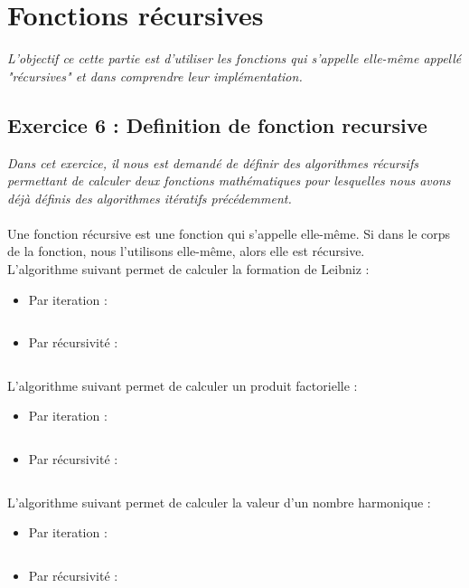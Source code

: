 \section{Fonctions récursives}
\textit{L’objectif ce cette partie est d’utiliser les fonctions qui s’appelle elle-même appellé "récursives" et dans comprendre leur implémentation.}

\subsection{Exercice 6 : Definition de fonction recursive}
\textit{Dans cet exercice, il nous est demandé de définir des algorithmes récursifs permettant de calculer deux fonctions mathématiques pour lesquelles nous avons déjà définis des algorithmes itératifs précédemment.}
\\\\
Une fonction récursive est une fonction qui s'appelle elle-même. Si dans le corps de la fonction, nous l'utilisons elle-même, alors elle est récursive.\\
L'algorithme suivant permet de calculer la formation de Leibniz :

\begin{itemize}
  \item Par iteration :
  \inputminted[linenos,firstline=7,lastline=14]{cpp}{../sources/cpp/TP1-2/piLeibniz.c}
  \item Par récursivité :
  \inputminted[linenos,firstline=16,lastline=19]{cpp}{../sources/cpp/TP1-2/piLeibniz.c}
\end{itemize}

L'algorithme suivant permet de calculer un produit factorielle :
\begin{itemize}
  \item Par iteration :
  \inputminted[linenos,firstline=7,lastline=14]{cpp}{../sources/cpp/TP1-2/factorielle.c}
  \item Par récursivité :
  \inputminted[linenos,firstline=16,lastline=21]{cpp}{../sources/cpp/TP1-2/factorielle.c}
\end{itemize}

L'algorithme suivant permet de calculer la valeur d'un nombre harmonique :
\begin{itemize}
  \item Par iteration :
  \inputminted[linenos,firstline=7,lastline=14]{cpp}{../sources/cpp/TP1-2/harmonique.c}
  \item Par récursivité :
  \inputminted[linenos,firstline=16,lastline=21]{cpp}{../sources/cpp/TP1-2/harmonique.c}
\end{itemize}

